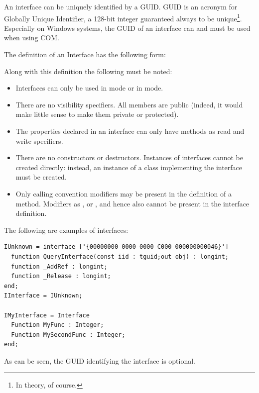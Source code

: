 An interface can be uniquely identified by a GUID. GUID is an acronym for
Globally Unique Identifier, a 128-bit integer guaranteed always to be
unique\footnote{In theory, of course.}. Especially on Windows systems,
the GUID of an interface can and must be used when using COM.

The definition of an Interface has the following form:

Along with this definition the following must be noted:
\begin{itemize}
\item Interfaces can only be used in  mode or in 
mode.
\item There are no visibility specifiers. All members are public (indeed,
it would make little sense to make them private or
protected).
\item The properties declared in an interface can only have methods as read and
write specifiers.
\item There are no constructors or destructors. Instances of interfaces
cannot be created directly: instead, an instance of a class implementing
the interface must be created.
\item Only calling convention modifiers may be present in the definition of
a method. Modifiers as ,  or , and
hence also  cannot be present in the interface
definition.
\end{itemize}
The following are examples of interfaces:
\begin{verbatim}
IUnknown = interface ['{00000000-0000-0000-C000-000000000046}']
  function QueryInterface(const iid : tguid;out obj) : longint;
  function _AddRef : longint;
  function _Release : longint;
end;
IInterface = IUnknown;

IMyInterface = Interface
  Function MyFunc : Integer;
  Function MySecondFunc : Integer;
end;
\end{verbatim}
As can be seen, the GUID identifying the interface is optional.

